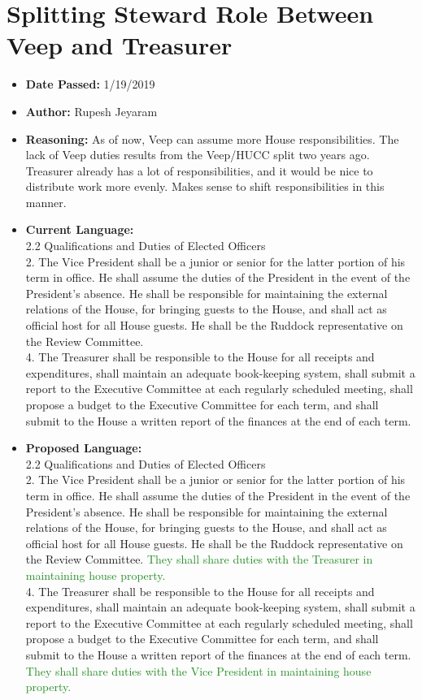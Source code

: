 \documentclass[10pt]{article} %
\begin{document}
\section{Splitting Steward Role Between Veep and Treasurer}
\begin{itemize}
	\item \textbf{Date Passed:} 1/19/2019
	\item \textbf{Author:} Rupesh Jeyaram
	\item \textbf{Reasoning:}  As of now, Veep can assume more House responsibilities. The lack of Veep duties results from the Veep/HUCC split two years ago. Treasurer already has a lot of responsibilities, and it would be nice to distribute work more evenly. Makes sense to shift responsibilities in this manner.
	\item \textbf{Current Language:} \\
	2.2 Qualifications and Duties of Elected Officers \\
	2. The Vice President shall be a junior or senior for the latter portion of his term in office. He shall assume the duties of the President in the event of the President's absence. He shall be responsible for maintaining the external relations of the House, for bringing guests to the House, and shall act as official host for all House guests. He shall be the Ruddock representative on the Review Committee. \\
	4. The Treasurer shall be responsible to the House for all receipts and expenditures, shall maintain an adequate book-keeping system, shall submit a report to the Executive Committee at each regularly scheduled meeting, shall propose a budget to the Executive Committee for each term, and shall submit to the House a written report of the finances at the end of each term. 
	\item \textbf{Proposed Language:} \\
	2.2 Qualifications and Duties of Elected Officers \\
	2. The Vice President shall be a junior or senior for the latter portion of his term in office. He shall assume the duties of the President in the event of the President's absence. He shall be responsible for maintaining the external relations of the House, for bringing guests to the House, and shall act as official host for all House guests. He shall be the Ruddock representative on the Review Committee. \textcolor{ForestGreen}{They shall share duties with the Treasurer in maintaining house property.} \\
	4. The Treasurer shall be responsible to the House for all receipts and expenditures, shall maintain an adequate book-keeping system, shall submit a report to the Executive Committee at each regularly scheduled meeting, shall propose a budget to the Executive Committee for each term, and shall submit to the House a written report of the finances at the end of each term. \textcolor{ForestGreen}{They shall share duties with the Vice President in maintaining house property.}
\end{itemize}
\end{document}
